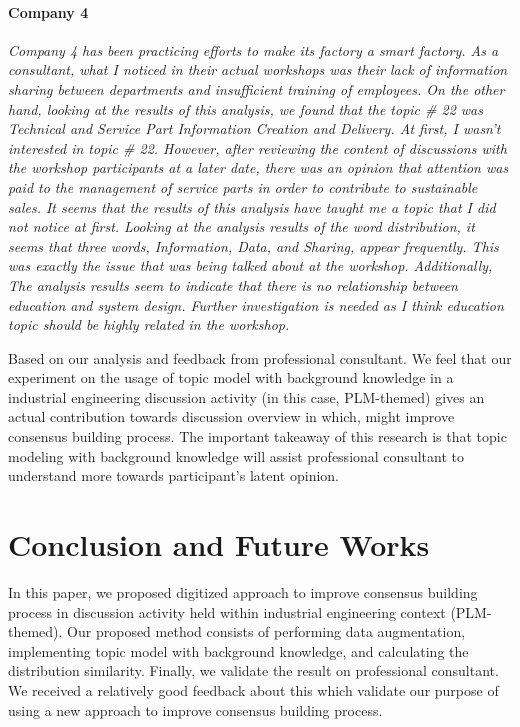 \documentclass[conference]{IEEEtran}
\begin{document}
\paragraph{Company 4}{\it Company 4 has been practicing efforts to make its factory a smart factory. As a consultant, what I noticed in their actual workshops was their lack of information sharing between departments and insufficient training of employees. On the other hand, looking at the results of this analysis, we found that the topic \# 22 was Technical and Service Part Information Creation and Delivery. At first, I wasn't interested in topic \# 22. However, after reviewing the content of discussions with the workshop participants at a later date, there was an opinion that attention was paid to the management of service parts in order to contribute to sustainable sales. It seems that the results of this analysis have taught me a topic that I did not notice at first. Looking at the analysis results of the word distribution, it seems that three words, Information, Data, and Sharing, appear frequently. This was exactly the issue that was being talked about at the workshop. Additionally, The analysis results seem to indicate that there is no relationship between education and system design. Further investigation is needed as I think education topic should be highly related in the workshop.}
\bigskip

Based on our analysis and feedback from professional consultant. We feel that our experiment on the usage of topic model with background knowledge in a industrial engineering discussion activity (in this case, PLM-themed) gives an actual contribution towards discussion overview in which, might improve consensus building process. The important takeaway of this  research is that topic modeling with background knowledge will assist professional consultant to understand more towards participant's latent opinion.

\section{Conclusion and Future Works}
In this paper, we proposed digitized approach to improve consensus building process in discussion activity held within industrial engineering context (PLM-themed). Our proposed method consists of performing data augmentation, implementing topic model with background knowledge, and calculating the distribution similarity. Finally, we validate the result on professional consultant. We received a relatively good feedback about this which validate our purpose of using a new approach to improve consensus building process.
\end{document}
